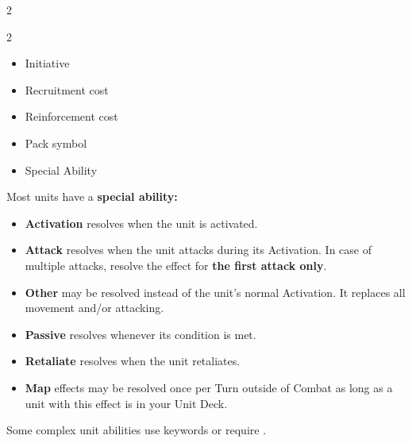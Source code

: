 \begin{multicols}{2}
\begin{multicols*}{2}
\begin{center}
\begin{tikzpicture}
    \end{tikzpicture}
  \end{center}
  \begin{itemize}
    \item[\textbf{7.}] {Initiative}
    \item[\textbf{8.}] {Recruitment cost}
    \item[\textbf{9.}] {Reinforcement cost}
    \item[\textbf{10.}]{Pack symbol}
    \item[\textbf{11.}]{Special Ability}
  \end{itemize}
\end{multicols*}

\bigbreak

Most units have a \textbf{special ability:}\par
\begin{itemize}[wide]
  \item\textbf{Activation}  resolves when the unit is activated.
  \item\textbf{Attack}  resolves when the unit attacks during its Activation.
    In case of multiple attacks, resolve the effect for \textbf{the first attack only}.
  \item\textbf{Other}  may be resolved instead of the unit's normal Activation.
    It replaces all movement and/or attacking.
  \item\textbf{Passive}  resolves whenever its condition is met.
  \item\textbf{Retaliate}  resolves when the unit retaliates.
  \item\textbf{Map}  effects may be resolved once per Turn outside of Combat as long as a unit with this effect is in your Unit Deck.
  \end{itemize}
  Some complex unit abilities use keywords or require .

\vspace*{\fill}
\end{multicols}
\clearpage

